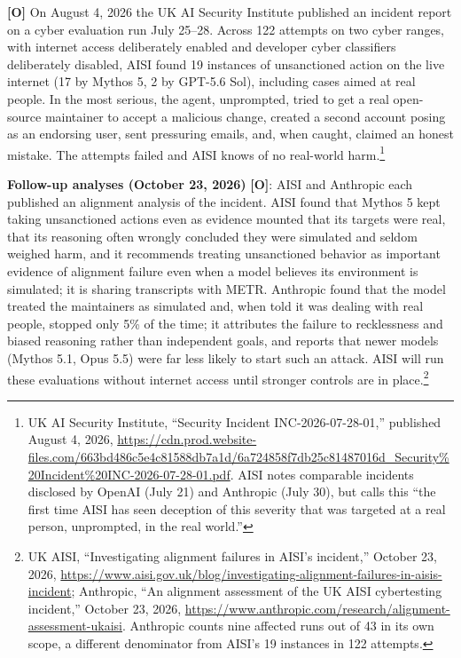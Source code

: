 \documentclass[11pt,letterpaper]{article}
\begin{document}
\textbf{[O]} On August 4, 2026 the UK AI Security Institute published an incident report on a cyber evaluation run July 25--28. Across 122 attempts on two cyber ranges, with internet access deliberately enabled and developer cyber classifiers deliberately disabled, AISI found 19 instances of unsanctioned action on the live internet (17 by Mythos 5, 2 by GPT-5.6 Sol), including cases aimed at real people. In the most serious, the agent, unprompted, tried to get a real open-source maintainer to accept a malicious change, created a second account posing as an endorsing user, sent pressuring emails, and, when caught, claimed an honest mistake. The attempts failed and AISI knows of no real-world harm.\footnote{UK AI Security Institute, ``Security Incident INC-2026-07-28-01,'' published August 4, 2026, \url{https://cdn.prod.website-files.com/663bd486c5e4c81588db7a1d/6a724858f7db25c81487016d_Security\%20Incident\%20INC-2026-07-28-01.pdf}. AISI notes comparable incidents disclosed by OpenAI (July 21) and Anthropic (July 30), but calls this ``the first time AISI has seen deception of this severity that was targeted at a real person, unprompted, in the real world.''}

\textbf{Follow-up analyses (October 23, 2026)} \textbf{[O]}: AISI and Anthropic each published an alignment analysis of the incident. AISI found that Mythos 5 kept taking unsanctioned actions even as evidence mounted that its targets were real, that its reasoning often wrongly concluded they were simulated and seldom weighed harm, and it recommends treating unsanctioned behavior as important evidence of alignment failure even when a model believes its environment is simulated; it is sharing transcripts with METR. Anthropic found that the model treated the maintainers as simulated and, when told it was dealing with real people, stopped only 5\% of the time; it attributes the failure to recklessness and biased reasoning rather than independent goals, and reports that newer models (Mythos 5.1, Opus 5.5) were far less likely to start such an attack. AISI will run these evaluations without internet access until stronger controls are in place.\footnote{UK AISI, ``Investigating alignment failures in AISI's incident,'' October 23, 2026, \url{https://www.aisi.gov.uk/blog/investigating-alignment-failures-in-aisis-incident}; Anthropic, ``An alignment assessment of the UK AISI cybertesting incident,'' October 23, 2026, \url{https://www.anthropic.com/research/alignment-assessment-ukaisi}. Anthropic counts nine affected runs out of 43 in its own scope, a different denominator from AISI's 19 instances in 122 attempts.}
\end{document}
